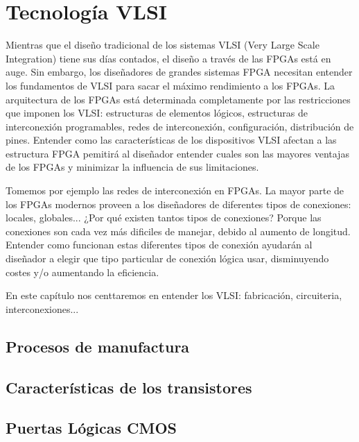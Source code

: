  \chapter{Tecnología VLSI}

Mientras que el diseño tradicional de los sistemas VLSI (Very Large Scale Integration) tiene sus días contados, el diseño a través de las FPGAs está en auge. Sin embargo, los diseñadores de grandes sistemas FPGA necesitan entender los fundamentos de VLSI para sacar el máximo rendimiento a los FPGAs. La arquitectura de los FPGAs está determinada completamente por las restricciones que imponen los VLSI: estructuras de elementos lógicos, estructuras de interconexión programables, redes de interconexión, configuración, distribución de pines. Entender como las características de los dispositivos VLSI afectan a las estructura FPGA pemitirá al diseñador entender cuales son las mayores ventajas de los FPGAs y minimizar la influencia de sus limitaciones. 

Tomemos por ejemplo las redes de interconexión en FPGAs. La mayor parte de los FPGAs modernos proveen a los diseñadores de diferentes tipos de conexiones: locales, globales... ¿Por qué existen tantos tipos de conexiones? Porque las conexiones son cada vez más dificiles de manejar, debido al aumento de longitud. Entender como funcionan estas diferentes tipos de conexión ayudarán al diseñador a elegir que tipo particular de conexión lógica usar, disminuyendo costes y/o aumentando la eficiencia. 

En este capítulo nos centtaremos en entender los VLSI: fabricación, circuiteria, interconexiones... 

\section{Procesos de manufactura}

\lipsum[1]

\lipsum[1]

\section{Características de los transistores}

\lipsum[1]

\lipsum[1]

\section{Puertas Lógicas CMOS}

